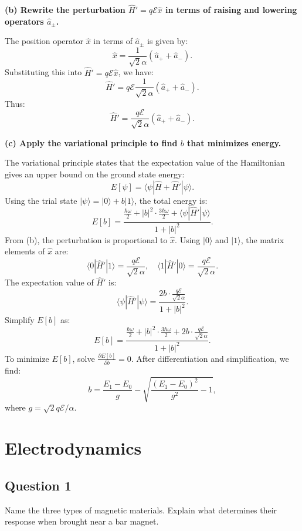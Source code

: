 \documentclass{article}
\begin{document}
\textbf{(b) Rewrite the perturbation \(\hat{H}' = q \mathcal{E} \hat{x}\) in terms of raising and lowering operators \(\hat{a}_\pm\).}

The position operator \(\hat{x}\) in terms of \(\hat{a}_\pm\) is given by:
\[
\hat{x} = \frac{1}{\sqrt{2} \alpha} (\hat{a}_+ + \hat{a}_-).
\]
Substituting this into \(\hat{H}' = q \mathcal{E} \hat{x}\), we have:
\[
\hat{H}' = q \mathcal{E} \frac{1}{\sqrt{2} \alpha} (\hat{a}_+ + \hat{a}_-).
\]
Thus:
\[
\hat{H}' = \frac{q \mathcal{E}}{\sqrt{2} \alpha} (\hat{a}_+ + \hat{a}_-).
\]

\textbf{(c) Apply the variational principle to find \(b\) that minimizes energy.}

The variational principle states that the expectation value of the Hamiltonian gives an upper bound on the ground state energy:
\[
E[\psi] = \langle \psi | \hat{H} + \hat{H}' | \psi \rangle.
\]
Using the trial state \(|\psi\rangle = |0\rangle + b |1\rangle\), the total energy is:
\[
E[b] = \frac{\frac{\hbar\omega}{2} + |b|^2 \cdot \frac{3\hbar\omega}{2} + \langle \psi | \hat{H}' | \psi \rangle}{1 + |b|^2}.
\]
From (b), the perturbation is proportional to \(\hat{x}\). Using \(|0\rangle\) and \(|1\rangle\), the matrix elements of \(\hat{x}\) are:
\[
\langle 0 | \hat{H}' | 1 \rangle = \frac{q \mathcal{E}}{\sqrt{2} \alpha}, \quad \langle 1 | \hat{H}' | 0 \rangle = \frac{q \mathcal{E}}{\sqrt{2} \alpha}.
\]
The expectation value of \(\hat{H}'\) is:
\[
\langle \psi | \hat{H}' | \psi \rangle = \frac{2 b \cdot \frac{q \mathcal{E}}{\sqrt{2} \alpha}}{1 + |b|^2}.
\]
Simplify \(E[b]\) as:
\[
E[b] = \frac{\frac{\hbar\omega}{2} + |b|^2 \cdot \frac{3\hbar\omega}{2} + 2b \cdot \frac{q \mathcal{E}}{\sqrt{2} \alpha}}{1 + |b|^2}.
\]
To minimize \(E[b]\), solve \(\frac{\partial E[b]}{\partial b} = 0\). After differentiation and simplification, we find:
\[
b = \frac{E_1 - E_0}{g} - \sqrt{\frac{(E_1 - E_0)^2}{g^2} - 1},
\]
where \(g = \sqrt{2} q \mathcal{E} / \alpha\).

\section{Electrodynamics}

\subsection{Question 1}

Name the three types of magnetic materials. Explain what determines their response when brought near a bar magnet. 
\end{document}
